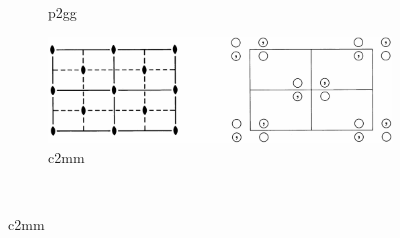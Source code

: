 \documentclass[12pt]{article}
\begin{document}
\begin{figure}[htp]
\begin{subfigure}[b]{0.45\textwidth}
        \caption*{p2gg}
    \end{subfigure}
    \begin{subfigure}[b]{0.45\textwidth}
        \centering
        \includegraphics[width=\textwidth]{planegroups/9.png}
        \caption*{c2mm}
    \end{subfigure}
	~    
    
\end{figure}
\end{document}
